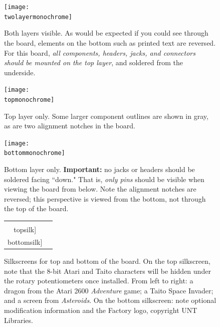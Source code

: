 \documentclass[12pt]{article}
\newcommand{\+}{\item}		%
\newcommand{\twolayermonochrome}{whiteboardlayout.png}
\newcommand{\topmonochrome}{toplayout.png}
\newcommand{\bottommonochrome}{bottomlayout.png}
\newcommand{\bottomsilk}{bottomsilk.png}
\newcommand{\topsilk}{topsilk.png}
\begin{document}
\begin{figure}
\begin{center}

\texttt{[image: \\twolayermonochrome]}

\end{center}

\caption{Both layers visible. As would be expected if you could see through the board, elements on the bottom such as printed text are reversed. For this board, \emph{all components, headers, jacks, and connectors should be mounted on the top layer}, and soldered from the underside.}
\end{figure}

\newpage

\begin{figure}
\begin{center}
\texttt{[image: \\topmonochrome]}
\end{center}
\caption{Top layer only. Some larger component outlines are shown in gray, as are two alignment notches in the board.}
\end{figure}


\begin{figure}
\begin{center}
\texttt{[image: \\bottommonochrome]}
\end{center}
\caption{Bottom layer only. \textbf{Important:} no jacks or headers should be soldered facing ``down." That is, \emph{only pins} should be visible when viewing the board from below. Note the alignment notches are reversed; this perspective is viewed from the bottom, not through the top of the board.}
\end{figure}


\newpage

\begin{figure}
\begin{center}
\begin{tabular}{cc}

\texttt{[image: \\topsilk]}

&

\texttt{[image: \\bottomsilk]}

\\

\end{tabular}

\end{center}
\caption{Silkscreens for top and bottom of the board. On the top silkscreen, note that the 8-bit Atari and Taito characters will be hidden under the rotary potentiometers once installed. From left to right: a dragon from the Atari 2600 \emph{Adventure} game; a Taito Space Invader; and a screen from \emph{Asteroids}. On the bottom silkscreen: note optional modification information and the Factory logo, copyright UNT Libraries.}
\end{figure}
\end{document}
